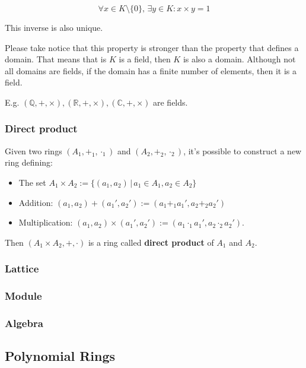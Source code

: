 \documentclass[
]{article}
\begin{document}
\[\forall x \in K \setminus \{0 \}, \, \exists y \in K : x \times y = 1\]

This inverse is also unique.

Please take notice that this property is stronger than the property that
defines a domain. That means that is \(K\) is a field, then \(K\) is
also a domain. Although not all domains are fields, if the domain has a
finite number of elements, then it is a field.

E.g.
\((\mathbb{Q},+,\times), (\mathbb{R},+,\times), (\mathbb{C},+,\times)\)
are fields.

\hypertarget{direct-product}{%
\subsubsection{Direct product}\label{direct-product}}

Given two rings \((A_1, +_1, \cdot_1)\) and \((A_2, +_2, \cdot_2)\),
it's possible to construct a new ring defining:

\begin{itemize}
\item
  The set
  \(A_1 \times A_2 := \{ (a_1, a_2) \, | \, a_1 \in A_1, a_2 \in A_2 \}\)
\item
  Addition:
  \((a_1, a_2) + (a_1', a_2') := (a_1 +_1 a_1', a_2 +_2 a_2')\)
\item
  Multiplication:
  \((a_1, a_2) \times (a_1', a_2') := (a_1 \cdot_1 a_1', a_2 \cdot_2 a_2')\).
\end{itemize}

Then \((A_1 \times A_2, +, \cdot)\) is a ring called \textbf{direct
product} of \(A_1\) and \(A_2\).

\hypertarget{lattice}{%
\subsubsection{Lattice}\label{lattice}}

\hypertarget{module}{%
\subsubsection{Module}\label{module}}

\hypertarget{algebra}{%
\subsubsection{Algebra}\label{algebra}}

\hypertarget{polynomial-rings}{%
\subsection{Polynomial Rings}\label{polynomial-rings}}
\end{document}
